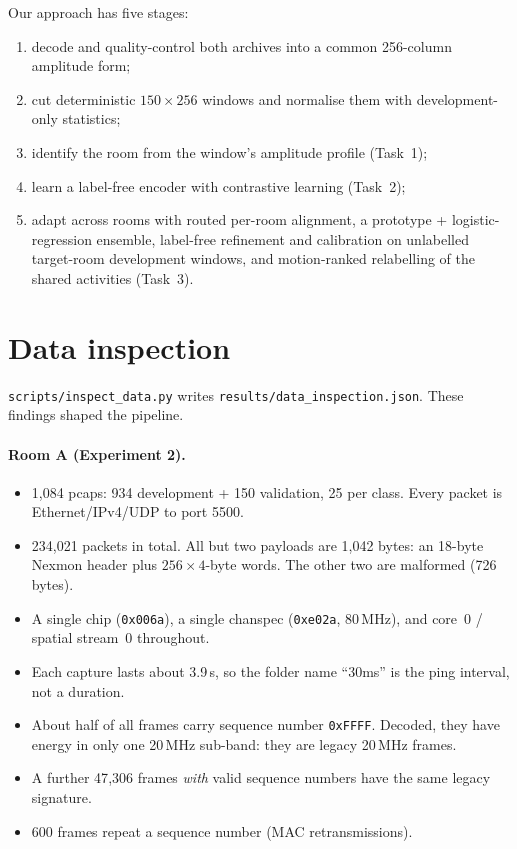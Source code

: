 \documentclass[11pt,a4paper]{article}
\begin{document}
Our approach has five stages:
\begin{enumerate}
  \item decode and quality-control both archives into a common 256-column amplitude form;
  \item cut deterministic $150\times256$ windows and normalise them with development-only statistics;
  \item identify the room from the window's amplitude profile (Task~1);
  \item learn a label-free encoder with contrastive learning (Task~2);
  \item adapt across rooms with routed per-room alignment, a prototype + logistic-regression ensemble, label-free refinement and calibration on unlabelled target-room development windows, and motion-ranked relabelling of the shared activities (Task~3).
\end{enumerate}

\section{Data inspection}

\texttt{scripts/inspect\_data.py} writes \texttt{results/data\_inspection.json}. These findings shaped the pipeline.

\paragraph{Room A (Experiment 2).}
\begin{itemize}
  \item 1{,}084 pcaps: 934 development + 150 validation, 25 per class. Every packet is Ethernet/IPv4/UDP to port 5500.
  \item 234{,}021 packets in total. All but two payloads are 1{,}042 bytes: an 18-byte Nexmon header plus $256\times4$-byte words. The other two are malformed (726 bytes).
  \item A single chip (\texttt{0x006a}), a single chanspec (\texttt{0xe02a}, 80\,MHz), and core~0 / spatial stream~0 throughout.
  \item Each capture lasts about 3.9\,s, so the folder name ``30ms'' is the ping interval, not a duration.
  \item About half of all frames carry sequence number \texttt{0xFFFF}. Decoded, they have energy in only one 20\,MHz sub-band: they are legacy 20\,MHz frames.
  \item A further 47{,}306 frames \emph{with} valid sequence numbers have the same legacy signature.
  \item 600 frames repeat a sequence number (MAC retransmissions).
\end{itemize}
\end{document}
